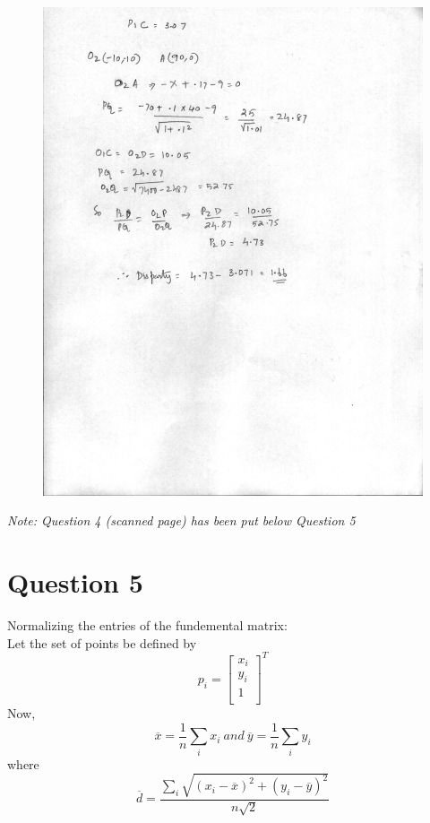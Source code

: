 \documentclass{article}
\begin{document}
\begin{figure}
\includegraphics[width=15cm]{2.jpg}
\end{figure}



\textit{Note: Question 4 (scanned page) has been put below Question 5}

\section*{Question 5}



Normalizing the entries of the fundemental matrix: \\

Let the set of points be defined by \\

\[
p_{i} = \begin{bmatrix}
    x_{i}\\
    y_{i}\\
    1\\
\end{bmatrix}^{T}
\]
Now, 
\[
 \overline{x} = \frac{1}{n}\sum_{i}x_{i}\  and\   \overline{y} = \frac{1}{n}\sum_{i}y_{i}
 \]
 where
 \[
 \overline{d} = \frac{\sum_{i}\sqrt{(x_{i} - \overline{x})^{2} + (y_{i} - \overline{y})^{2}}}{n\sqrt{2}}
 \]
\end{document}
